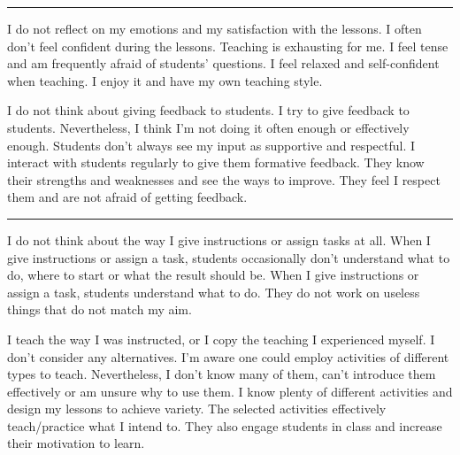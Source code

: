 \rule{\textwidth}{0.4pt}
{I do not reflect on my emotions and my satisfaction with the lessons.}
{I often don't feel confident during the lessons. Teaching is exhausting for me. I feel tense and am frequently afraid of students' questions.}
{I feel relaxed and self-confident when teaching. I enjoy it and have my own teaching style.}

\newpage
{}
{I do not think about giving feedback to students.}
{I try to give feedback to students. Nevertheless, I think I'm not doing it often enough or effectively enough. Students don't always see my input as supportive and respectful.}
{I interact with students regularly to give them formative feedback. They know their strengths and weaknesses and see the ways to improve. They feel I respect them and are not afraid of getting feedback.}

\rule{\textwidth}{0.4pt}
{I do not think about the way I give instructions or assign tasks at all.}
{When I give instructions or assign a task, students occasionally don't understand what to do, where to start or what the result should be.}
{When I give instructions or assign a task, students understand what to do. They do not work on useless things that do not match my aim.} %

\newpage
{}
{I teach the way I was instructed, or I copy the teaching I experienced myself. I don't consider any alternatives.}
{I'm aware one could employ activities of different types to teach. Nevertheless, I don't know many of them, can't introduce them effectively or am unsure why to use them.}
{I know plenty of different activities and design my lessons to achieve variety. The selected activities effectively teach/practice what I intend to. They also engage students in class and increase their motivation to learn.}


